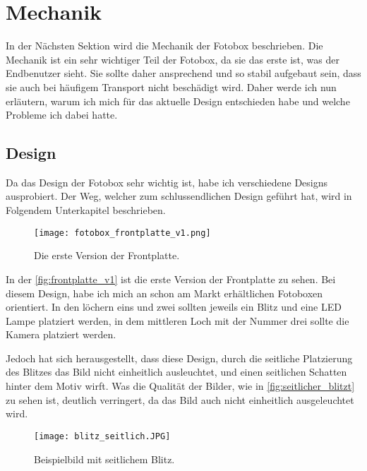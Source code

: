 \graphicspath{{images/mechanics}}

\section{Mechanik}

In der Nächsten Sektion wird die Mechanik der Fotobox beschrieben.
Die Mechanik ist ein sehr wichtiger Teil der Fotobox, da sie das erste
ist, was der Endbenutzer sieht. Sie sollte daher ansprechend und so stabil
aufgebaut sein, dass sie auch bei häufigem Transport nicht beschädigt wird.
Daher werde ich nun erläutern, warum ich mich für das aktuelle Design entschieden habe
und welche Probleme ich dabei hatte.

\subsection{Design}

Da das Design der Fotobox sehr wichtig ist, habe ich verschiedene Designs ausprobiert.
Der Weg, welcher zum schlussendlichen Design geführt hat, wird in Folgendem Unterkapitel beschrieben.

\begin{figure}[H]
    \centering
    \texttt{[image: fotobox\_frontplatte\_v1.png]}
    \caption{Die erste Version der Frontplatte.}
    \label{fig:frontplatte_v1}
\end{figure}

In der \autoref{fig:frontplatte_v1} ist die erste Version der Frontplatte zu sehen.
Bei diesem Design, habe ich mich an schon am Markt erhältlichen Fotoboxen orientiert.
In den löchern eins und zwei sollten jeweils ein Blitz und eine LED Lampe platziert werden,
in dem mittleren Loch mit der Nummer drei sollte die Kamera platziert werden.

Jedoch hat sich herausgestellt, dass diese Design, durch die seitliche Platzierung des Blitzes
das Bild nicht einheitlich ausleuchtet, und einen seitlichen Schatten hinter dem 
Motiv wirft. Was die Qualität der Bilder, wie in \autoref{fig:seitlicher_blitzt}
zu sehen ist, deutlich verringert, da das Bild auch nicht einheitlich ausgeleuchtet wird.

\newpage
\begin{figure}[H]
    \centering
    \texttt{[image: blitz\_seitlich.JPG]}
    \caption{Beispielbild mit seitlichem Blitz.}
    \label{fig:seitlicher_blitzt}
\end{figure}

